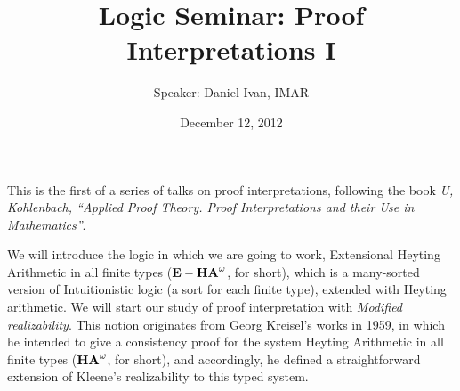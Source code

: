 \documentclass[a4paper,12pt]{article}
\title{Logic Seminar: Proof Interpretations I}
\author{Speaker: Daniel Ivan, IMAR}
\date{December 12, 2012}
\begin{document}
\maketitle
This is the first of a series of talks on proof interpretations, following the book \emph{U, Kohlenbach, ``Applied Proof Theory. Proof Interpretations and their Use in Mathematics''}.

We will introduce the logic in which we are going to work,  Extensional Heyting Arithmetic in all finite types (${\bf E-HA}^\omega$, for short), which is a many-sorted version of Intuitionistic logic (a sort for each finite type), extended with Heyting arithmetic.
We will start our study of proof interpretation with \emph{Modified realizability}. This notion originates from  Georg Kreisel's works in 1959, in which he intended to give a consistency proof for the system Heyting Arithmetic in all finite types (${\bf HA}^\omega$, for short), and accordingly, he defined a straightforward extension of Kleene's realizability to this typed system. 
\end{document}
